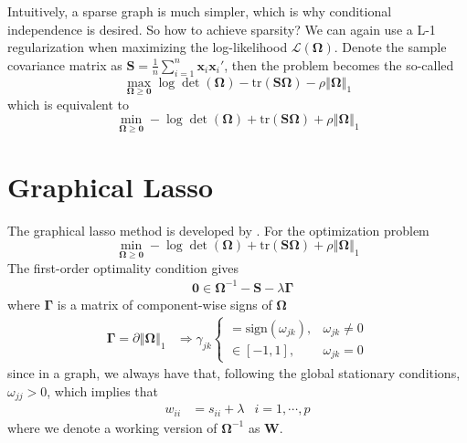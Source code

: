 \documentclass[twoside]{article}
\begin{document}
Intuitively, a sparse graph is much simpler, which is why conditional independence is desired. So how to achieve sparsity? We can again use a L-1 regularization when maximizing the log-likelihood $\mathcal{L}(\boldsymbol{\Omega})$. Denote the sample covariance matrix as $\mathbf{S} = \frac{1}{n}\sum^n_{i=1}\mathbf{x}_i\mathbf{x}_i'$, then the problem becomes the so-called 
$$
\max_{\boldsymbol{\Omega}\geq \mathbf{0}}\log \det (\boldsymbol{\Omega}) - \mathrm{tr}(\mathbf{S}\boldsymbol{\Omega}) - \rho\left\Vert \boldsymbol{\Omega} \right\Vert _1
$$
which is equivalent to 
$$
\min_{\boldsymbol{\Omega}\geq \mathbf{0}} -\log \det (\boldsymbol{\Omega}) + \mathrm{tr}(\mathbf{S}\boldsymbol{\Omega}) +\rho\left\Vert \boldsymbol{\Omega} \right\Vert _1
$$

\section{Graphical Lasso}
The graphical lasso method is developed by \citep{friedman2008sparse}. For the optimization problem 
\begin{equation}
    \min_{\boldsymbol{\Omega}\geq \mathbf{0}} -\log \det (\boldsymbol{\Omega}) + \mathrm{tr}(\mathbf{S}\boldsymbol{\Omega}) +\rho\left\Vert \boldsymbol{\Omega} \right\Vert _1 
\end{equation}
The first-order optimality condition gives
\begin{align*}
    &\mathbf{0} \in \boldsymbol{\Omega}^{-1} - \mathbf{S} -\lambda \boldsymbol{\Gamma}
\end{align*}
where $\boldsymbol{\Gamma}$ is a matrix of component-wise signs of $\boldsymbol{\Omega}$
\begin{align*}
    \boldsymbol{\Gamma} = \partial \left\Vert \boldsymbol{\Omega} \right\Vert _1 & \Rightarrow \gamma_{jk} \begin{cases}
        = \text{sign}(\omega_{jk}), &\omega_{jk}\neq 0\\
        \in  [-1,1], &\omega_{jk}=0
    \end{cases}
\end{align*}
since in a graph, we always have that, following the global stationary conditions, $\omega_{jj}>0$, which implies that 
\begin{align}\label{eq:ghlasso_stationary_condition}
    w_{ii} &= s_{ii} + \lambda & i=1,\cdots,p
\end{align}
where we denote a working version of $\boldsymbol{\Omega}^{-1}$ as $\mathbf{W}$.
\end{document}
